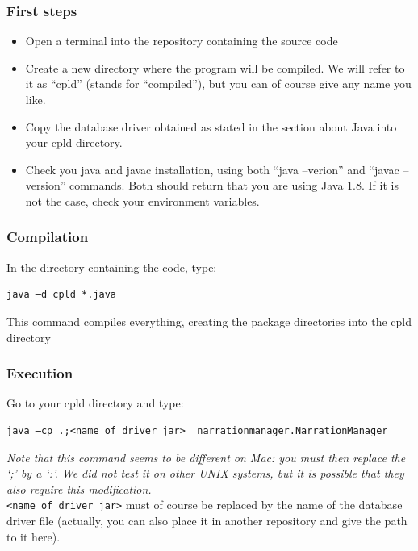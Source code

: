 \documentclass[a4paper ,12pt,french]{article}
\begin{document}
\subsubsection{First steps}

\begin{itemize}
\item Open a terminal into the repository containing the source code
\item Create a new directory where the program will be compiled. We will refer to it as “cpld” (stands for “compiled”), but you can of course give any name you like.
\item Copy the database driver obtained as stated in the section about Java into your cpld directory.
\item Check you java and javac installation, using both “java –verion” and “javac –version” commands. Both should return that you are using Java 1.8. If it is not the case, check your environment variables.

\end{itemize}

\subsubsection{Compilation}

In the directory containing the code, type:
\begin{verbatim}
java –d cpld *.java
\end{verbatim}
This command compiles everything, creating the package directories into the cpld directory
\subsubsection{Execution}
Go to your cpld directory and type:

\begin{verbatim}
java –cp .;<name_of_driver_jar>  narrationmanager.NarrationManager
\end{verbatim}

\textit{Note that this command seems to be different on Mac: you must then replace the ‘;’ by a ‘:’. We did not test it on other UNIX systems, but it is possible that they also require this modification.}\\

\texttt{<name\_of\_driver\_jar>} must of course be replaced by the name of the database driver file (actually, you can also place it in another repository and give the path to it here).\\ 
\end{document}
